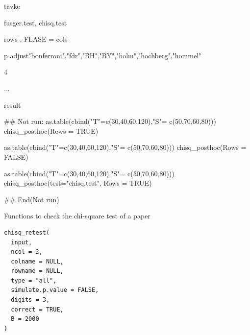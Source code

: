\documentclass[a4paper]{book}
\begin{document}
%
\begin{Arguments}
\begin{ldescription}
\item[\code{tbl}] tavke

\item[\code{test}] fusger.test, chisq.test

\item[\code{Rows}] rows , FLASE = cols

\item[\code{control}] p adjust"bonferroni","fdr","BH","BY","holm","hochberg","hommel"

\item[\code{digits}] 4

\item[\code{...}] ...
\end{ldescription}
\end{Arguments}
%
\begin{Value}
result
\end{Value}
%
\begin{Examples}
\begin{ExampleCode}

\#\# Not run: 
as.table(cbind("T"=c(30,40,60,120),"S"= c(50,70,60,80)))%
  chisq_posthoc(Rows  = TRUE)

as.table(cbind("T"=c(30,40,60,120),"S"= c(50,70,60,80)))%
  chisq_posthoc(Rows  = FALSE)

as.table(cbind("T"=c(30,40,60,120),"S"= c(50,70,60,80)))%
  chisq_posthoc(test="chisq.test", Rows  = TRUE)

## End(Not run)


\end{ExampleCode}
\end{Examples}
%
\begin{Description}
Functions to check the chi-square test of a paper
\end{Description}
%
\begin{Usage}
\begin{verbatim}
chisq_retest(
  input,
  ncol = 2,
  colname = NULL,
  rowname = NULL,
  type = "all",
  simulate.p.value = FALSE,
  digits = 3,
  correct = TRUE,
  B = 2000
)
\end{verbatim}
\end{Usage}
%
\end{document}
